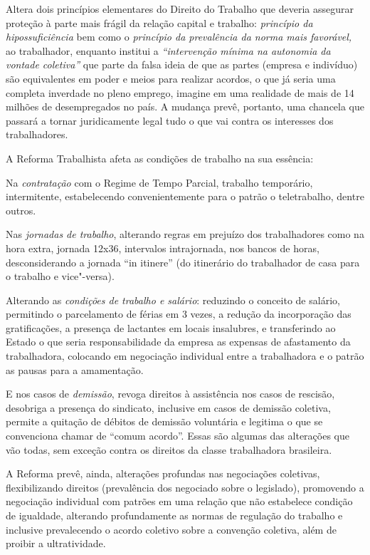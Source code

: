 Altera dois princípios elementares do Direito do Trabalho que deveria
assegurar proteção à parte mais frágil da relação capital e trabalho:
\emph{princípio da hipossuficiência} bem como o \emph{princípio da
prevalência da norma mais favorável,} ao trabalhador, enquanto institui
a \emph{``intervenção mínima na autonomia da vontade coletiva''} que
parte da falsa ideia de que as partes (empresa e indivíduo) são
equivalentes em poder e meios para realizar acordos, o que já seria uma
completa inverdade no pleno emprego, imagine em uma realidade de mais de
14 milhões de desempregados no país. A mudança prevê, portanto, uma
chancela que passará a tornar juridicamente legal tudo o que vai contra
os interesses dos trabalhadores.

A Reforma Trabalhista afeta as condições de trabalho na sua essência:

Na \emph{contratação} com o Regime de Tempo Parcial, trabalho
temporário, intermitente, estabelecendo convenientemente para o patrão o
teletrabalho, dentre outros.

Nas \emph{jornadas de trabalho}, alterando regras em prejuízo dos
trabalhadores como na hora extra, jornada 12x36, intervalos
intrajornada, nos bancos de horas, desconsiderando a jornada ``in
itinere'' (do itinerário do trabalhador de casa para o trabalho e
vice"-versa).

Alterando as \emph{condições de trabalho e salário}: reduzindo o
conceito de salário, permitindo o parcelamento de férias em 3 vezes, a
redução da incorporação das gratificações, a presença de lactantes em
locais insalubres, e transferindo ao Estado o que seria responsabilidade
da empresa as expensas de afastamento da trabalhadora, colocando em
negociação individual entre a trabalhadora e o patrão as pausas para a
amamentação.

E nos casos de \emph{demissão}, revoga direitos à assistência nos casos
de rescisão, desobriga a presença do sindicato, inclusive em casos de
demissão coletiva, permite a quitação de débitos de demissão voluntária
e legitima o que se convenciona chamar de ``comum acordo''. Essas são
algumas das alterações que vão todas, sem exceção contra os direitos da
classe trabalhadora brasileira.

A Reforma prevê, ainda, alterações profundas nas negociações coletivas,
flexibilizando direitos (prevalência dos negociado sobre o legislado),
promovendo a negociação individual com patrões em uma relação que não
estabelece condição de igualdade, alterando profundamente as normas de
regulação do trabalho e inclusive prevalecendo o acordo coletivo sobre a
convenção coletiva, além de proibir a ultratividade.


